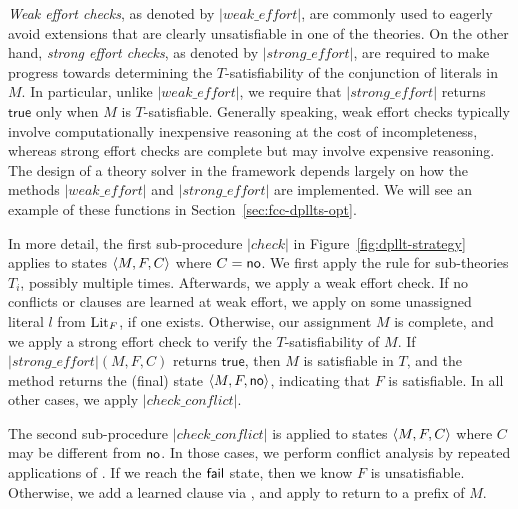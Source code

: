\documentclass{svjour3}                     %
\begin{document}
\emph{Weak effort checks}, as denoted by $|weak\_effort|$,
are commonly used to eagerly avoid extensions that are clearly unsatisfiable in one of the theories.
On the other hand, \emph{strong effort checks}, as denoted by $|strong\_effort|$,
are required to make progress towards determining the $T$-satisfiability of the conjunction of literals in $M$.
In particular, unlike $|weak\_effort|$, we require that $|strong\_effort|$ returns
$\mathsf{true}$ only when $M$ is $T$-satisfiable.
Generally speaking, weak effort checks typically involve computationally inexpensive reasoning at the cost of incompleteness,
whereas strong effort checks are complete but may involve expensive reasoning.
The design of a theory solver in the \dpllts framework depends largely on how the methods
$|weak\_effort|$ and $|strong\_effort|$ are implemented.
We will see an example of these functions in Section~\ref{sec:fcc-dpllts-opt}.

In more detail, the first sub-procedure $|check|$ in Figure~\ref{fig:dpllt-strategy} applies to states $\langle M,F,C \rangle$ where $C = \mathsf{no}$.
We first apply the rule  for sub-theories $T_i$, possibly multiple times.
Afterwards, we apply a weak effort check.
If no conflicts or clauses are learned at weak effort, 
we apply \decide on some unassigned literal $l$ from $\mathrm{Lit}_{F}$, if one exists.
Otherwise, our assignment $M$ is complete, and we apply a strong effort check to verify the $T$-satisfiability of $M$.
If $|strong\_effort|( M, F, C )$ returns $\mathsf{true}$, then $M$ is satisfiable in $T$,
and the method returns the (final) state $\langle  M, F, \mathsf{no}  \rangle$,
indicating that $F$ is satisfiable.
In all other cases, we apply $|check\_conflict|$.

The second sub-procedure $|check\_conflict|$ is applied to states $\langle M,F,C \rangle$ where $C$ may be different from $\mathsf{no}$.
In those cases,
we perform conflict analysis by repeated applications of .
If we reach the $\mathsf{fail}$ state, %
then we know $F$ is unsatisfiable.
Otherwise, we add a learned clause via \learn, and apply \backjump to return to a prefix of $M$.
\end{document}
